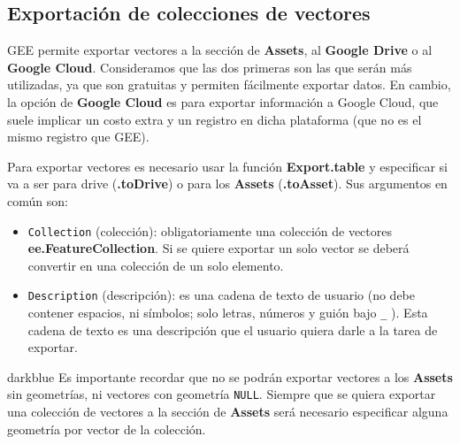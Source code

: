 \documentclass[
  12pt,
  letterpaper,
  twoside]{book}
\providecommand{\tightlist}{%
  \setlength{\itemsep}{0pt}\setlength{\parskip}{0pt}}
\newcommand\boldpurple[1]{\textcolor{darkpurple}{\textbf{#1}}}
\begin{document}
\hypertarget{exportaciuxf3n-de-colecciones-de-vectores}{%
\subsection*{Exportación de colecciones de vectores}\label{exportaciuxf3n-de-colecciones-de-vectores}}

GEE permite exportar vectores a la sección de \textbf{Assets}, al \textbf{Google Drive} o al \textbf{Google Cloud}. Consideramos que las dos primeras son las que serán más utilizadas, ya que son gratuitas y permiten fácilmente exportar datos. En cambio, la opción de \textbf{Google Cloud} es para exportar información a Google Cloud, que suele implicar un costo extra y un registro en dicha plataforma (que no es el mismo registro que GEE).

Para exportar vectores es necesario usar la función \boldpurple{Export.table} y especificar si va a ser para drive (\boldpurple{.toDrive}) o para los \textbf{Assets} (\boldpurple{.toAsset}). Sus argumentos en común son:

\begin{itemize}
\tightlist
\item
  \texttt{Collection} (colección): obligatoriamente una colección de vectores \boldpurple{ee.FeatureCollection}. Si se quiere exportar un solo vector se deberá convertir en una colección de un solo elemento.
\item
  \texttt{Description} (descripción): es una cadena de texto de usuario (no debe contener espacios, ni símbolos; solo letras, números y guión bajo \texttt{\_} ). Esta cadena de texto es una descripción que el usuario quiera darle a la tarea de exportar.
\end{itemize}

\begin{bluebox2}

\begin{awesomeblock}{5pt}{\faLightbulb}{darkblue}
Es importante recordar que no se podrán exportar vectores a los \textbf{Assets} sin geometrías, ni vectores con geometría \texttt{NULL}. Siempre que se quiera exportar una colección de vectores a la sección de \textbf{Assets} será necesario especificar alguna geometría por vector de la colección.

\end{awesomeblock}

\end{bluebox2}
\end{document}

